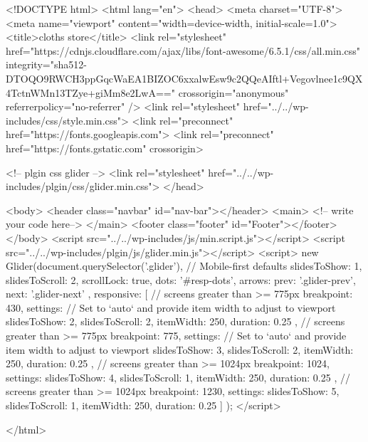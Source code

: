 <!DOCTYPE html>
<html lang="en">
<head>
    <meta charset="UTF-8">
    <meta name="viewport" content="width=device-width, initial-scale=1.0">
    <title>cloths store</title>
    <link rel="stylesheet" href="https://cdnjs.cloudflare.com/ajax/libs/font-awesome/6.5.1/css/all.min.css"
        integrity="sha512-DTOQO9RWCH3ppGqcWaEA1BIZOC6xxalwEsw9c2QQeAIftl+Vegovlnee1c9QX4TctnWMn13TZye+giMm8e2LwA=="
        crossorigin="anonymous" referrerpolicy="no-referrer" />
    <link rel="stylesheet" href="../../wp-includes/css/style.min.css">
    <link rel="preconnect" href="https://fonts.googleapis.com">
    <link rel="preconnect" href="https://fonts.gstatic.com" crossorigin>

    <!-- plgin css glider -->
    <link rel="stylesheet" href="../../wp-includes/plgin/css/glider.min.css">
</head>

<body>
    <header class="navbar" id="nav-bar"></header>
    <main>
<!-- write your code here-->
    </main>
    <footer class="footer" id="Footer"></footer>
</body>
<script src="../../wp-includes/js/min.script.js"></script>
<script src="../../wp-includes/plgin/js/glider.min.js"></script>
<script>
    new Glider(document.querySelector('.glider'), {
        // Mobile-first defaults
        slidesToShow: 1,
        slidesToScroll: 2,
        scrollLock: true,
        dots: '#resp-dots',
        arrows: {
            prev: '.glider-prev',
            next: '.glider-next'
        },
        responsive: [
            {
                // screens greater than >= 775px
                breakpoint: 430,
                settings: {
                    // Set to `auto` and provide item width to adjust to viewport
                    slidesToShow: 2,
                    slidesToScroll: 2,
                    itemWidth: 250,
                    duration: 0.25
                }
            },
            {
                // screens greater than >= 775px
                breakpoint: 775,
                settings: {
                    // Set to `auto` and provide item width to adjust to viewport
                    slidesToShow: 3,
                    slidesToScroll: 2,
                    itemWidth: 250,
                    duration: 0.25
                }
            }, {
                // screens greater than >= 1024px
                breakpoint: 1024,
                settings: {
                    slidesToShow: 4,
                    slidesToScroll: 1,
                    itemWidth: 250,
                    duration: 0.25
                }
            }, {
                // screens greater than >= 1024px
                breakpoint: 1230,
                settings: {
                    slidesToShow: 5,
                    slidesToScroll: 1,
                    itemWidth: 250,
                    duration: 0.25
                }
            }
        ]
    });
</script>

</html>